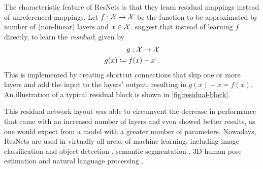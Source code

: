 The characteristic feature of ResNets is that they learn residual mappings instead of unreferenced mappings.
Let $f: \mathcal{X} \rightarrow \mathcal{X}$ be the function to be approximated by number of (non-linear) layers and $x \in \mathcal{X}$.
\citet{he16} suggest that instead of learning $f$ directly, to learn the \emph{residual}; given by
\begin{equation}
	\begin{split}
		g: \mathcal{X} \rightarrow \mathcal{X} \\
		g(x) \coloneqq f(x) - x \ .
	\end{split}
\end{equation}
This is implemented by creating shortcut connections that skip one or more layers and add the input to the layers' output, resulting in $g(x) + x = f(x)$.
An illustration of a typical residual block is shown in \cref{fig:residual-block}.



This residual network layout was able to circumvent the decrease in performance that came with an increased number of layers and even showed better results, as one would expect from a model with a greater number of parameters.
Nowadays, ResNets are used in virtually all areas of machine learning, including image classification and object detection \cite{he16}, semantic segmentation \cite{chen17}, 3D human pose estimation \cite{drover18} and natural language processing \cite{keskar19,conneau16}.
